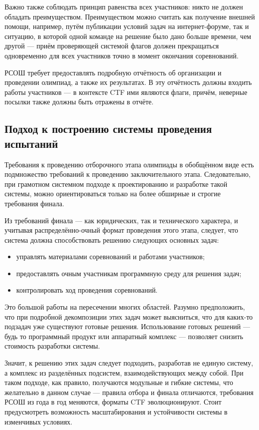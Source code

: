 Важно также соблюдать принцип равенства всех участников: никто не должен обладать преимуществом. Преимуществом можно считать как получение внешней помощи, например, путём публикации условий задач на интернет-форуме, так и ситуацию, в которой одной команде на решение было дано больше времени, чем другой — приём проверяющей системой флагов должен прекращаться одновременно для всех участников точно в момент окончания соревнований.

РСОШ требует предоставлять подробную отчётность об организации и проведении олимпиад, а также их результатах. В эту отчётность должны входить работы участников — в контексте CTF ими являются флаги, причём, неверные посылки также должны быть отражены в отчёте.

\subsection{Подход к построению системы проведения испытаний}

Требования к проведению отборочного этапа олимпиады в обобщённом виде есть подмножество требований к проведению заключительного этапа. Следовательно, при грамотном системном подходе к проектированию и разработке такой системы, можно ориентироваться только на более обширные и строгие требования финала.

Из требований финала — как юридических, так и технического характера, и учитывая распределённо-очный формат проведения этого этапа, следует, что система должна способствовать решению следующих основных задач:

\begin{itemize}
\item управлять материалами соревнований и работами участников;
\item предоставлять очным участникам программную среду для решения задач;
\item контролировать ход проведения соревнований.
\end{itemize}

Это большой работы на пересечении многих областей. Разумно предположить, что при подробной декомпозиции этих задач может выясниться, что для каких-то подзадач уже существуют готовые решения. Использование готовых решений — будь то программный продукт или аппаратный комплекс — позволяет снизить стоимость разработки системы.

Значит, к решению этих задач следует подходить, разработав не единую систему, а комплекс из разделённых подсистем, взаимодействующих между собой. При таком подходе, как правило, получаются модульные и гибкие системы, что желательно в данном случае — правила отбора и финала отличаются, требования РСОШ из года в год меняются, форматы CTF эволюционируют. Стоит предусмотреть возможность масштабирования и устойчивости системы в изменчивых условиях.


